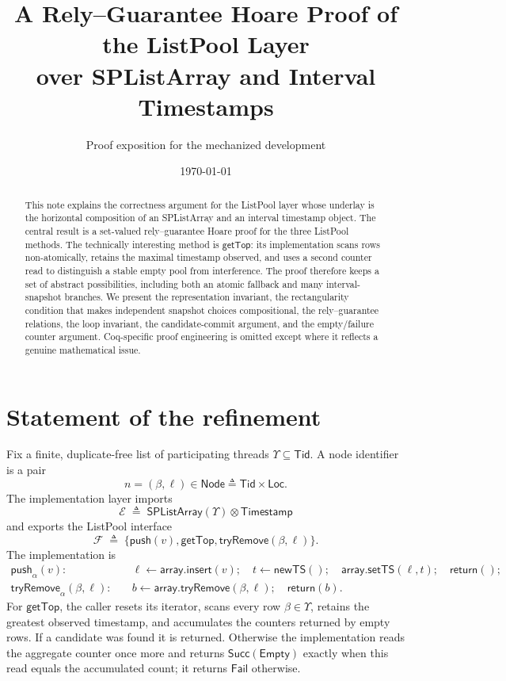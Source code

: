 \documentclass[11pt]{article}
\title{A Rely--Guarantee Hoare Proof of the ListPool Layer\\
  \large over SPListArray and Interval Timestamps}
\author{Proof exposition for the mechanized development}
\date{\today}
\theoremstyle{definition}
\theoremstyle{remark}
\newcommand{\Tid}{\mathsf{Tid}}
\newcommand{\Loc}{\mathsf{Loc}}
\newcommand{\Node}{\mathsf{Node}}
\newcommand{\GetTop}{\mathsf{getTop}}
\newcommand{\Push}{\mathsf{push}}
\newcommand{\TryRemove}{\mathsf{tryRemove}}
\newcommand{\Succ}{\mathsf{Succ}}
\newcommand{\Fail}{\mathsf{Fail}}
\newcommand{\Empty}{\mathsf{Empty}}
\begin{document}
\maketitle

\begin{abstract}
This note explains the correctness argument for the ListPool layer whose
underlay is the horizontal composition of an SPListArray and an interval
timestamp object.  The central result is a set-valued rely--guarantee Hoare
proof for the three ListPool methods.  The technically interesting method is
\(\GetTop\): its implementation scans rows non-atomically, retains the maximal
timestamp observed, and uses a second counter read to distinguish a stable
empty pool from interference.  The proof therefore keeps a set of abstract
possibilities, including both an atomic fallback and many interval-snapshot
branches.  We present the representation invariant, the rectangularity
condition that makes independent snapshot choices compositional, the
rely--guarantee relations, the loop invariant, the candidate-commit argument,
and the empty/failure counter argument.  Coq-specific proof engineering is
omitted except where it reflects a genuine mathematical issue.
\end{abstract}

\tableofcontents

\section{Statement of the refinement}

Fix a finite, duplicate-free list of participating threads
\(\Upsilon\subseteq\Tid\).  A node identifier is a pair
\[
  n=(\beta,\ell)\in\Node\triangleq\Tid\times\Loc .
\]
The implementation layer imports
\[
  \mathcal E \;\triangleq\;
  \mathsf{SPListArray}(\Upsilon)\otimes \mathsf{Timestamp}
\]
and exports the ListPool interface
\[
  \mathcal F \;\triangleq\;
  \{\Push(v),\GetTop,\TryRemove(\beta,\ell)\}.
\]
The implementation is
\begin{align*}
\Push_\alpha(v):\quad &
  \ell\leftarrow\mathsf{array.insert}(v);\quad
  t\leftarrow\mathsf{newTS}();\quad
  \mathsf{array.setTS}(\ell,t);\quad \mathsf{return}();
\\
\TryRemove_\alpha(\beta,\ell):\quad &
  b\leftarrow\mathsf{array.tryRemove}(\beta,\ell);\quad
  \mathsf{return}(b).
\end{align*}
For \(\GetTop\), the caller resets its iterator, scans every row
\(\beta\in\Upsilon\), retains the greatest observed timestamp, and accumulates
the counters returned by empty rows.  If a candidate was found it is returned.
Otherwise the implementation reads the aggregate counter once more and
returns \(\Succ(\Empty)\) exactly when this read equals the accumulated count;
it returns \(\Fail\) otherwise.
\end{document}
